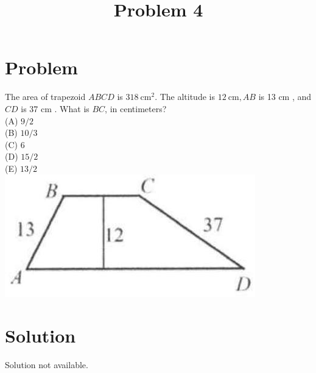 \documentclass{article}
\title{Problem 4}
\date{}
\begin{document}
\maketitle

\section*{Problem}
The area of trapezoid \(A B C D\) is \(318 \mathrm{~cm}^{2}\). The altitude is \(12 \mathrm{~cm}, A B\) is 13 cm , and \(C D\) is 37 cm . What is \(B C\), in centimeters?\\
(A) \(9 / 2\)\\
(B) \(10 / 3\)\\
(C) 6\\
(D) \(15 / 2\)\\
(E) \(13 / 2\)\\
\centering
\includegraphics[width=\textwidth]{images/088.jpg}

\section*{Solution}
Solution not available.
\end{document}
